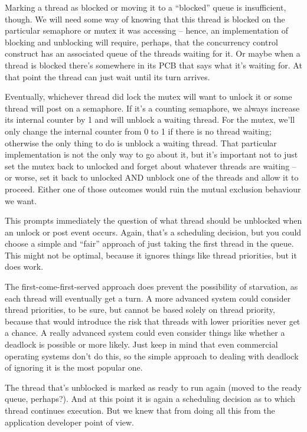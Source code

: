 Marking a thread as blocked or moving it to a ``blocked'' queue is insufficient, though. We will need some way of knowing that this thread is blocked on the particular semaphore or mutex it was accessing -- hence, an implementation of blocking and unblocking will require, perhaps, that the concurrency control construct has an associated queue of the threads waiting for it. Or maybe when a thread is blocked there's somewhere in its PCB that says what it's waiting for. At that point the thread can just wait until its turn arrives.

Eventually, whichever thread did lock the mutex will want to unlock it or some thread will post on a semaphore. If it's a counting semaphore, we always increase its internal counter by 1 and will unblock a waiting thread. For the mutex, we'll only change the internal counter from 0 to 1 if there is no thread waiting; otherwise the only thing to do is unblock a waiting thread. That particular implementation is not the only way to go about it, but it's important not to just set the mutex back to unlocked and forget about whatever threads are waiting -- or worse, set it back to unlocked AND unblock one of the threads and allow it to proceed. Either one of those outcomes would ruin the mutual exclusion behaviour we want.

This prompts immediately the question of what thread should be unblocked when an unlock or post event occurs. Again, that's a scheduling decision, but you could choose a simple and ``fair'' approach of just taking the first thread in the queue. This might not be optimal, because it ignores things like thread priorities, but it does work. 

The first-come-first-served approach does prevent the possibility of starvation, as each thread will eventually get a turn. A more advanced system could consider thread priorities, to be sure, but cannot be based solely on thread priority, because that would introduce the risk that threads with lower priorities never get a chance. A really advanced system could even consider things like whether a deadlock is possible or more likely. Just keep in mind that even commercial operating systems don't do this, so the simple approach to dealing with deadlock of ignoring it is the most popular one. 

The thread that's unblocked is marked as ready to run again (moved to the ready queue, perhaps?). And at this point it is again a scheduling decision as to which thread continues execution. But we knew that from doing all this from the application developer point of view.

